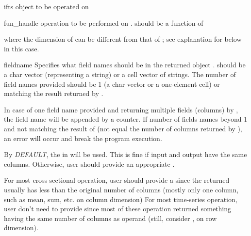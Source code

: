 \where
   \begin{argdesc}
    \item[ifts] \myfints{} object to be operated on
    \item[fun\_handle] operation to be performed on .
                  should be a function of \par
                 \hspace{1.0cm} \par
                 where the dimension of  
                 can be different from that of ;
                 see explanation for  below in this case.                 
    \item[fieldname] Specifies what field names should be in the returned
                 \myfints{} object .
                  should be a char vector (representing a string)
                 or a cell vector of strings. 
                 The number of field names provided should be 1 (a char
                 vector or a one-element cell) or matching the result
                 returned by . 

                 In case of one field name provided and returning 
                 multiple fields (columns) by , 
                 the field name will be appended by a counter.
                 If number of fields names beyond 1 and not matching the 
                 result of  (not equal the number of columns
                 returned by ), 
                 an error will occur and break the
                 program execution.

                 By \emph{DEFAULT}, 
                 the  in  will be used.
                 This is fine if input and output have the same columns.
                 Otherwise,
                 user should provide an appropriate .

                 For most cross-sectional operation,
                 user should provide a 
                 since the returned usually 
                 has less than the original number of columns (mostly only
                 one column, such as mean, sum, etc. on column dimension)
                 For most time-series operation,
                 user don't need to provide  since most of these
                 operation returned something having the same number of
                 columns as operand 
                 (still, consider ,  on row dimension).
 

\end{argdesc}
